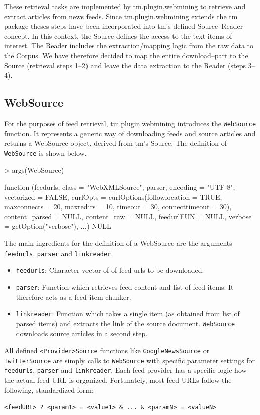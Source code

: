 \documentclass[a4paper]{article}
\let\code=\texttt
\newcommand{\class}[1]{\mbox{\textsf{#1}}}
\newcommand{\pkg}[1]{{\normalfont\fontseries{b}\selectfont #1}}
\newcommand{\fkt}[1]{\code{#1}}
\begin{document}
These retrieval tasks are implemented by \pkg{tm.plugin.webmining} to retrieve and extract articles
from news feeds. Since \pkg{tm.plugin.webmining} extends the \pkg{tm} package theses steps
have been incorporated into \pkg{tm}'s defined \class{Source}--\class{Reader} concept.
In this context, the \class{Source} defines the access to the text items of interest.
The \class{Reader} includes the extraction/mapping logic from the raw data to the \class{Corpus}.
We have therefore decided to map the entire download--part to the \class{Source} (retrieval steps 1--2) and leave the
data extraction to the \class{Reader} (steps 3--4).

\subsection{WebSource}
For the purposes of feed retrieval, \pkg{tm.plugin.webmining} introduces the \fkt{WebSource} function.
It represents a generic way of downloading feeds and source articles and returns a \class{WebSource} object,
derived from \pkg{tm}'s \class{Source}. The definition of \fkt{WebSource} is shown below.
\begin{Schunk}
\begin{Sinput}
> args(WebSource)
\end{Sinput}
\begin{Soutput}
function (feedurls, class = "WebXMLSource", parser, encoding = "UTF-8", 
    vectorized = FALSE, curlOpts = curlOptions(followlocation = TRUE, 
        maxconnects = 20, maxredirs = 10, timeout = 30, connecttimeout = 30), 
    content_parsed = NULL, content_raw = NULL, feedurlFUN = NULL, 
    verbose = getOption("verbose"), ...) 
NULL
\end{Soutput}
\end{Schunk}
The main ingredients for the definition of a \class{WebSource} are the arguments \code{feedurls},
\code{parser} and \code{linkreader}. 

\begin{itemize}
\item \code{feedurls}: Character vector of of feed urls to be downloaded.
\item \code{parser}: Function which retrieves feed content and list of feed items. It therefore acts
as a feed item chunker.
\item \code{linkreader}: Function which takes a single item (as obtained from list of parsed items) and
extracts the link of the source document. \fkt{WebSource} downloads source articles in a second step.
\end{itemize}
All defined \fkt{<Provider>Source} functions like \fkt{GoogleNewsSource} or \fkt{TwitterSource} are simply calls to
\fkt{WebSource} with specific parameter settings for \code{feedurls}, \code{parser} and \code{linkreader}.
Each feed provider has a specific logic how the actual feed URL is organized. Fortunately, most feed URLs
follow the following, standardized form:
\begin{center}
\code{<feedURL> ? <param1> = <value1> \& ... \& <paramN> = <valueN>}
\end{center}
\end{document}
